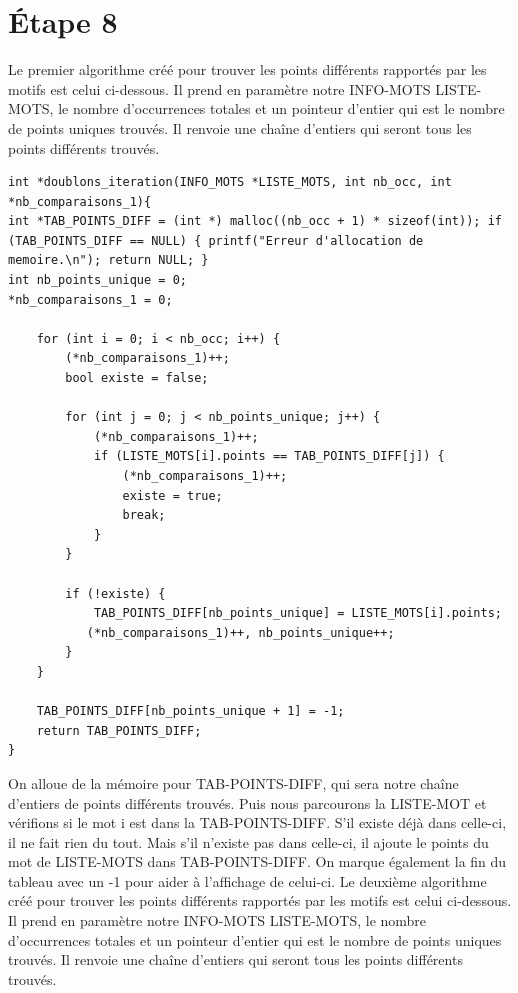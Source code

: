\documentclass{article}
\begin{document}
\section*{Étape 8}
Le premier algorithme créé pour trouver les points différents rapportés par les motifs est celui ci-dessous. Il prend en paramètre notre INFO-MOTS LISTE-MOTS, le nombre d'occurrences totales et un pointeur d'entier qui est le nombre de points uniques trouvés. Il renvoie une chaîne d'entiers qui seront tous les points différents trouvés.
\begin{lstlisting}[style=Cstyle]
int *doublons_iteration(INFO_MOTS *LISTE_MOTS, int nb_occ, int *nb_comparaisons_1){
int *TAB_POINTS_DIFF = (int *) malloc((nb_occ + 1) * sizeof(int)); if (TAB_POINTS_DIFF == NULL) { printf("Erreur d'allocation de memoire.\n"); return NULL; }
int nb_points_unique = 0;
*nb_comparaisons_1 = 0;
 
    for (int i = 0; i < nb_occ; i++) {
        (*nb_comparaisons_1)++;
        bool existe = false;
        
        for (int j = 0; j < nb_points_unique; j++) {
            (*nb_comparaisons_1)++;
            if (LISTE_MOTS[i].points == TAB_POINTS_DIFF[j]) {
                (*nb_comparaisons_1)++;
                existe = true;
                break;
            }
        }
        
        if (!existe) {
            TAB_POINTS_DIFF[nb_points_unique] = LISTE_MOTS[i].points;
           (*nb_comparaisons_1)++, nb_points_unique++;
        }
    }

    TAB_POINTS_DIFF[nb_points_unique + 1] = -1;
    return TAB_POINTS_DIFF;
}
\end{lstlisting}
On alloue de la mémoire pour TAB-POINTS-DIFF, qui sera notre chaîne d'entiers de points différents trouvés. Puis nous parcourons la LISTE-MOT et vérifions si le mot i est dans la TAB-POINTS-DIFF. S'il existe déjà dans celle-ci, il ne fait rien du tout. Mais s'il n'existe pas dans celle-ci, il ajoute le points du mot de LISTE-MOTS dans TAB-POINTS-DIFF. On marque également la fin du tableau avec un -1 pour aider à l'affichage de celui-ci.\newline\newline
Le deuxième algorithme créé pour trouver les points différents rapportés par les motifs est celui ci-dessous. Il prend en paramètre notre INFO-MOTS LISTE-MOTS, le nombre d'occurrences totales et un pointeur d'entier qui est le nombre de points uniques trouvés. Il renvoie une chaîne d'entiers qui seront tous les points différents trouvés.
\end{document}
